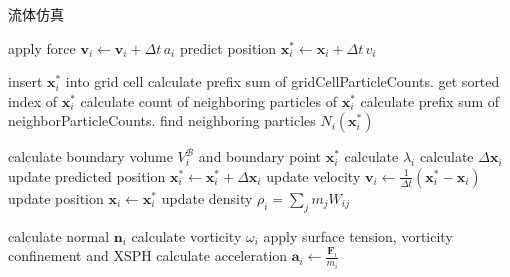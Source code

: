     \begin{algorithm}
    	\caption{流体仿真}
    	\begin{algorithmic}[1]
     
    	 
    		\State apply force $\mathbf v_i \leftarrow \mathbf v_i + \Delta t \mathbf \, a_i$
    		\State predict position $\mathbf x^*_i \leftarrow  \mathbf x_i + \Delta t \mathbf \, v_i$
    	\EndFor

    	 
    		\State insert $\mathbf x^*_i$ into grid cell
    	\EndFor
    	\State calculate prefix sum of gridCellParticleCounts.
    		\State get sorted index of $\mathbf x^*_i$ \quad {}
    	\EndFor
    		\State calculate count of neighboring particles of $\mathbf x^*_i$
    	\EndFor
    	\State calculate prefix sum of neighborParticleCounts.
    		\State find neighboring particles $N_i(\mathbf x^*_i)$
    	\EndFor

    	 
    			\State calculate boundary volume $V_i^{\mathcal B}$ and boundary point $\mathbf x_i^*$  \quad {}
    		\EndFor
    			\State calculate $\lambda_i$  \quad {}
    		\EndFor
    			\State calculate $\Delta \mathbf x_i$  \quad {}
    		\EndFor
    			\State update predicted position $\mathbf x^*_i \leftarrow \mathbf x^*_i + \Delta \mathbf x_i$
    		\EndFor
    	\EndWhile
    		\State update velocity $\mathbf v_i \leftarrow \frac{1}{\Delta t} (\mathbf x^*_i -\mathbf x_i)$
    		\State update position $\mathbf x_i \leftarrow \mathbf x^*_i$
    		\State update density $\rho_i = \sum_j m_j W_{ij}$
    	\EndFor

         
            \State calculate normal $\mathbf n_i$  \quad {}
            \State calculate vorticity $\omega_i$  \quad {}
        \EndFor
            \State apply surface tension, vorticity confinement and XSPH 
            \State calculate acceleration $\mathbf a_i \leftarrow \frac{\mathbf F_i}{m_i}$
        \EndFor
     
        \end{algorithmic}
    \end{algorithm}

